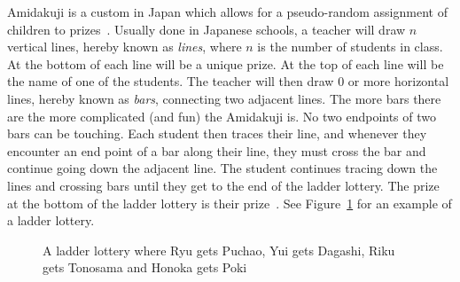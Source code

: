 Amidakuji is a custom in Japan which 
allows for a pseudo-random assignment of children to prizes~\cite{A1}. 
Usually done in Japanese schools, a teacher will draw $n$ vertical lines, 
hereby known as \emph{lines}, where $n$ is the number of students in class. 
At the bottom of each line will be a unique prize. At the top of each line will be the name of one of the students.  
The teacher will then draw 0 or more horizontal lines, hereby known as \emph{bars}, 
connecting two adjacent lines. The more bars there are the more complicated (and fun) 
the Amidakuji is. No two endpoints of two bars can be touching. Each student then traces 
their line, and whenever they encounter an end point of a bar along their line, 
they must cross the bar and continue going down the adjacent line. 
The student continues tracing down the lines and crossing bars 
until they get to the end of the ladder lottery. The prize at the bottom of the ladder lottery 
is their prize~\cite{A1}. See Figure~\ref{fig:aa} for an example of a ladder lottery.
\begin{center}
\begin{figure}[h]
	\centering
\caption{\tiny{A ladder lottery where Ryu gets Puchao, Yui gets Dagashi, Riku gets Tonosama and Honoka gets Poki}}
\label{fig:aa}
\end{figure}
\end{center}
